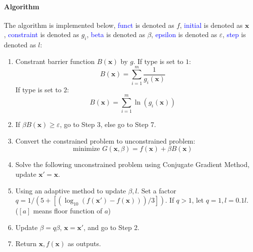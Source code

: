 \documentclass{article}
\begin{document}
\paragraph{Algorithm}
The algorithm is implemented below, \textcolor{blue}{funct} is denoted as $f$, \textcolor{blue}{initial} is denoted as $\mathbf{x}$, \textcolor{blue}{constraint} is denoted as $g_i$, \textcolor{blue}{beta} is denoted as $\beta$,  \textcolor{blue}{epsilon} is denoted as $\varepsilon$, \textcolor{blue}{step} is denoted as $l$:
\begin{enumerate}
    \item Constrant barrier function $B(\mathbf{x})$ by $g$. If type is set to $1$:
    \begin{equation*}
        B(\mathbf{x}) = \sum_{i = 1}^{m}{\frac{1}{g_i(\mathbf{x})}}
    \end{equation*}
    If type is set to $2$:
    \begin{equation*}
        B(\mathbf{x}) = \sum_{i = 1}^{m}{\ln{(g_i(\mathbf{x}))}}
    \end{equation*}
    \item If $\beta B(\mathbf{x}) \geqslant \varepsilon$, go to Step 3, else go to Step 7.
    \item Convert the constrained problem to unconstrained problem:
    \begin{equation*}
        \mbox{minimize } G(\mathbf{x}, \beta) = f(\mathbf{x}) + \beta B(\mathbf{x})
    \end{equation*}
    \item Solve the following unconstrained problem using Conjugate Gradient Method, update $\mathbf{x'} = \mathbf{x}$.
    \item Using an adaptive method to update $\beta, l$. Set a factor $q = 1 / (5 + [(\log_{10}{(f(\mathbf{x'}) - f(\mathbf{x}))}) / {3}])$. If $q > 1$, let $q = 1, l = 0.1l$. ($[a]$ means floor function of $a$)
    \item Update $\beta = q\beta$, $\mathbf{x} = \mathbf{x'}$, and go to Step 2.
    \item Return $\mathbf{x}, f(\mathbf{x})$ as outputs.
\end{enumerate}
\end{document}
